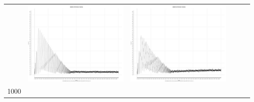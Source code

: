 \begin{table}[htbp]
{\begin{tabular}{l | ccccc}
    			   & \begin{minipage}{.085\textwidth}\vspace{2pt}     							
     			 	\includegraphics[width=\linewidth]{images/mema-graph/N7}
    				 \end{minipage}
    			   &	 \begin{minipage}{.085\textwidth}\vspace{2pt}     							
     			 	\includegraphics[width=\linewidth]{images/mema-graph/N10}
    				 \end{minipage}\\	
		1000   &	 \begin{minipage}{.085\textwidth}\vspace{2pt}     							

\end{minipage}
\end{tabular}}
\end{table}
